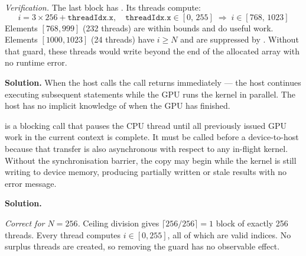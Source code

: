 \textit{Verification.} The last block has . Its
threads compute:
\[
  i = 3 \times 256 + \texttt{threadIdx.x}, \quad
  \texttt{threadIdx.x} \in [0,\,255]
  \;\Longrightarrow\;
  i \in [768,\,1023]
\]
Elements $[768, 999]$ (232 threads) are within bounds and do useful work.
Elements $[1000, 1023]$ (24 threads) have $i \geq N$ and are suppressed by
. Without that guard, these threads would write beyond
the end of the allocated array with no runtime error.

\begin{ppexercises}
\end{ppexercises}

\textbf{Solution.}
When the host calls  the call returns
immediately --- the host continues executing subsequent statements while the
GPU runs the kernel in parallel. The host has no implicit knowledge of when
the GPU has finished.

 is a blocking call that pauses the CPU
thread until all previously issued GPU work in the current context is
complete. It must be called before a device-to-host 
because that transfer is also asynchronous with respect to any in-flight
kernel. Without the synchronisation barrier, the copy may begin while the
kernel is still writing to device memory, producing partially written or
stale results with no error message.

\begin{ppexercises}
\end{ppexercises}

\textbf{Solution.}

\textit{Correct for $N = 256$.}
Ceiling division gives $\lceil 256/256 \rceil = 1$ block of exactly 256
threads. Every thread computes $i \in [0, 255]$, all of which are valid
indices. No surplus threads are created, so removing the guard has no
observable effect.

